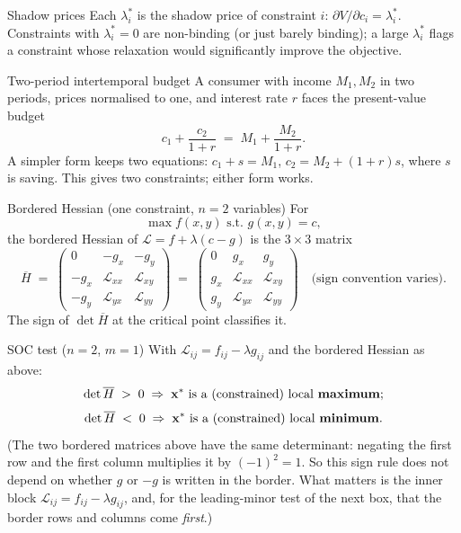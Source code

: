 \begin{rulebox}{Shadow prices}
Each $\lambda_i^*$ is the shadow price of constraint $i$:
$\partial V/\partial c_i = \lambda_i^*$. Constraints with
$\lambda_i^* = 0$ are non-binding (or just barely binding); a large
$\lambda_i^*$ flags a constraint whose relaxation would significantly
improve the objective.
\end{rulebox}

\begin{rulebox}{Two-period intertemporal budget}
A consumer with income $M_1, M_2$ in two periods, prices normalised to
one, and interest rate $r$ faces the present-value budget
\[
c_1 + \frac{c_2}{1 + r} \;=\; M_1 + \frac{M_2}{1 + r}.
\]
A simpler form keeps two equations: $c_1 + s = M_1$,
$c_2 = M_2 + (1 + r) s$, where $s$ is saving. This gives two constraints;
either form works.
\end{rulebox}

\begin{rulebox}{Bordered Hessian (one constraint, $n = 2$ variables)}
For
\[
\max f(x, y) \text{ s.t.\ } g(x, y) = c,
\]
the bordered Hessian of $\mathcal{L} = f + \lambda(c - g)$ is the
$3 \times 3$ matrix
\[
\overline{H} \;=\; \begin{pmatrix}
0 & -g_x & -g_y \\
-g_x & \mathcal{L}_{xx} & \mathcal{L}_{xy} \\
-g_y & \mathcal{L}_{yx} & \mathcal{L}_{yy}
\end{pmatrix}
\;=\;
\begin{pmatrix}
0 & g_x & g_y \\
g_x & \mathcal{L}_{xx} & \mathcal{L}_{xy} \\
g_y & \mathcal{L}_{yx} & \mathcal{L}_{yy}
\end{pmatrix} \quad \text{(sign convention varies)}.
\]
The sign of $\det \overline{H}$ at the critical point classifies it.
\end{rulebox}

\begin{rulebox}{SOC test ($n = 2$, $m = 1$)}
With $\mathcal{L}_{ij} = f_{ij} - \lambda g_{ij}$ and the bordered Hessian
as above:
\[
\det \overline{H} \;>\; 0 \;\Rightarrow\; \mathbf{x}^* \text{ is a
(constrained) local \textbf{maximum}};
\]
\[
\det \overline{H} \;<\; 0 \;\Rightarrow\; \mathbf{x}^* \text{ is a
(constrained) local \textbf{minimum}}.
\]
(The two bordered matrices above have the same determinant: negating
the first row and the first column multiplies it by $(-1)^{2}=1$. So this
sign rule does not depend on whether $g$ or $-g$ is written in the border.
What matters is the inner block $\mathcal{L}_{ij}=f_{ij}-\lambda g_{ij}$,
and, for the leading-minor test of the next box, that the border rows and
columns come \emph{first}.)
\end{rulebox}

